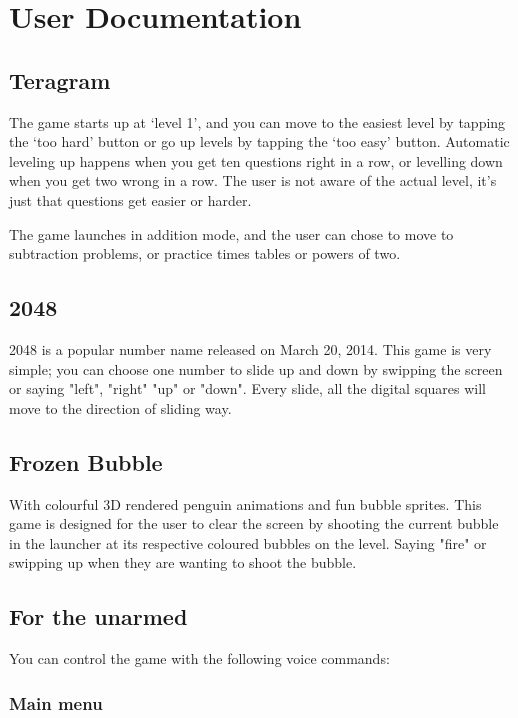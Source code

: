 \documentclass[11pt, oneside]{article}
\begin{document}
\pagebreak

\section*{User Documentation}

\subsection*{Teragram}
The game starts up at `level 1', and you can move to the easiest level
by tapping the `too hard' button or go up levels by tapping the `too
easy' button. Automatic leveling up happens when you get ten
questions right in a row, or levelling down when you get two wrong in
a row. The user is not aware of the actual level, it's just that
questions get easier or harder.

The game launches in addition mode, and the user can chose to move to
subtraction problems, or practice times tables or powers of two.

\subsection*{2048}
2048 is a popular number name released on March 20, 2014. This game is 
very simple; you can choose one number to slide up and down by swipping
the screen or saying "left", "right" "up" or "down". Every slide, all the digital 
squares will move to the direction of sliding way.

\subsection*{Frozen Bubble}
With colourful 3D rendered penguin animations and fun bubble sprites. 
This game is designed for the user to clear the screen by shooting the 
current bubble in the launcher at its respective coloured bubbles on 
the level. Saying "fire" or swipping up when they are wanting to shoot
the bubble.  

\subsection*{For the unarmed}

You can control the game with the following voice commands:

\subsubsection*{Main menu}
\end{document}

